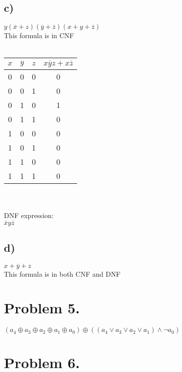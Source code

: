 \documentclass{article}
\begin{document}
\subsection*{c)}
$y(\overline{x}+z)(\overline{y}+\overline{z})(x+y+\overline{z})$\\
This formula is in CNF\\
\vspace{0mm}\\
\begin{tabular}{| c | c | c || c |}
    \hline
    $x$ & $y$ & $z$ & $x\overline{y}z+x\overline{z}$ \\ \hline \hline
    0 & 0 & 0 & 0 \\ \hline
    0 & 0 & 1 & 0 \\ \hline
    0 & 1 & 0 & 1 \\ \hline
    0 & 1 & 1 & 0 \\ \hline
    1 & 0 & 0 & 0 \\ \hline
    1 & 0 & 1 & 0 \\ \hline
    1 & 1 & 0 & 0 \\ \hline
    1 & 1 & 1 & 0 \\ \hline
\end{tabular}\\
\vspace{0mm}\\
DNF expression:\\
$\overline{x}y\overline{z}$
\subsection*{d)}
$x+\overline{y}+z$\\
This formula is in both CNF and DNF
\section*{Problem 5.}
$(a_4\oplus a_3\oplus a_2\oplus a_1\oplus a_0)\oplus((a_4\lor a_3\lor a_2\lor a_1)\land \neg a_0)$
\section*{Problem 6.}
\end{document}

